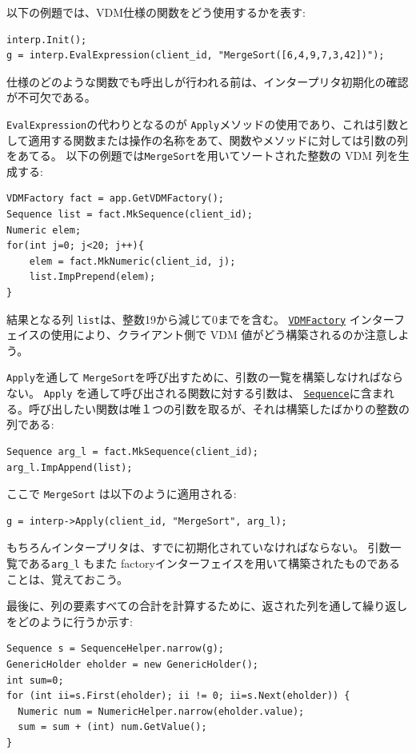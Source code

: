 \documentclass[\pformat,12pt]{jarticle}
\newcommand{\VDMFactory}{\hyperlink{interface.VDMFactory}{VDMFactory}}
\newcommand{\Sequence}{\hyperlink{interface.VDMSequence}{Sequence}}
\begin{document}
以下の例題では、VDM仕様の関数をどう使用するかを表す: 

\begin{verbatim}
interp.Init();
g = interp.EvalExpression(client_id, "MergeSort([6,4,9,7,3,42])");
\end{verbatim}

仕様のどのような関数でも呼出しが行われる前は、インタープリタ初期化の確認が不可欠である。

{\tt EvalExpression}の代わりとなるのが {\tt  Apply}メソッドの使用であり、これは引数として適用する関数または操作の名称をあて、関数やメソッドに対しては引数の列をあてる。
以下の例題では{\tt MergeSort}を用いてソートされた整数の VDM 列を生成する:

\begin{verbatim}
VDMFactory fact = app.GetVDMFactory();
Sequence list = fact.MkSequence(client_id);
Numeric elem;
for(int j=0; j<20; j++){
    elem = fact.MkNumeric(client_id, j);
    list.ImpPrepend(elem);
}
\end{verbatim}                

結果となる列 {\tt list}は、整数19から減じて0までを含む。
 {\tt \VDMFactory} インターフェイスの使用により、クライアント側で VDM 値がどう構築されるのか注意しよう。

{\tt Apply}を通して {\tt MergeSort}を呼び出すために、引数の一覧を構築しなければならない。
{\tt Apply} を通して呼び出される関数に対する引数は、 {\tt \Sequence}に含まれる。呼び出したい関数は唯１つの引数を取るが、それは構築したばかりの整数の列である:

\begin{verbatim}
Sequence arg_l = fact.MkSequence(client_id);
arg_l.ImpAppend(list);
\end{verbatim}

ここで \texttt{MergeSort} は以下のように適用される:

\begin{verbatim}
g = interp->Apply(client_id, "MergeSort", arg_l);
\end{verbatim}

もちろんインタープリタは、すでに初期化されていなければならない。
引数一覧である{\tt arg\_l} もまた factoryインターフェイスを用いて構築されたものであることは、覚えておこう。

最後に、列の要素すべての合計を計算するために、返された列を通して繰り返しをどのように行うか示す:

\begin{verbatim}
Sequence s = SequenceHelper.narrow(g);
GenericHolder eholder = new GenericHolder();
int sum=0;
for (int ii=s.First(eholder); ii != 0; ii=s.Next(eholder)) {
  Numeric num = NumericHelper.narrow(eholder.value);
  sum = sum + (int) num.GetValue();
}
\end{verbatim}
\end{document}
